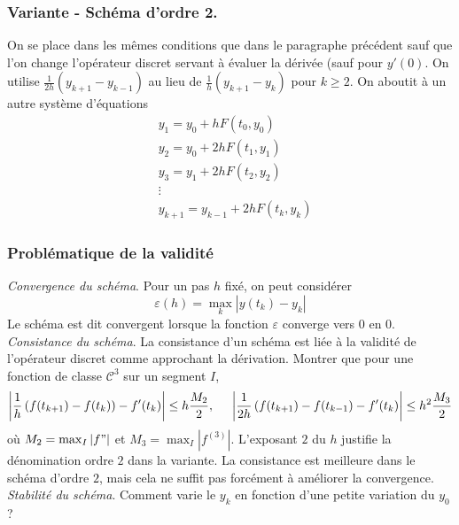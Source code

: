 \subsubsection{Variante - Schéma d'ordre 2.}
On se place dans les mêmes conditions que dans le paragraphe précédent sauf que l'on change l'opérateur discret servant à évaluer la dérivée (sauf pour $y'(0)$. On utilise $\frac{1}{2h}(y_{k+1}-y_{k-1})$ au lieu de $\frac{1}{h}(y_{k+1}-y_{k})$ pour $k\geq 2$. On aboutit à un autre système d'équations
\begin{align*}
  &y_1 = y_0 + hF(t_0,y_0) \\ &y_2 = y_0 + 2hF(t_1,y_1)\\ &y_3 = y_1 + 2hF(t_2,y_2)\\ &\vdots \\ &y_{k+1} = y_{k-1} + 2hF(t_k,y_k)
\end{align*}

\subsubsection{Problématique de la validité}
\emph{Convergence du schéma}. Pour un pas $h$ fixé, on peut considérer
\begin{displaymath}
  \varepsilon(h)=\max_{k}|y(t_k) - y_k|
\end{displaymath}
Le schéma est dit convergent lorsque la fonction $\varepsilon$ converge vers $0$ en $0$.\newline
\emph{Consistance du schéma}. La consistance d'un schéma est liée à la validité de l'opérateur discret comme approchant la dérivation.\newline
Montrer que pour une fonction de classe $\mathcal{C}^3$ sur un segment $I$,
\begin{displaymath}
  \left|\frac{1}{h}\left( f(t_{k+1})-f(t_k)\right) -f'(t_k) \right|\leq h\frac{M_2}{2},\hspace{0.5cm}
  \left|\frac{1}{2h}\left( f(t_{k+1})-f(t_{k-1}\right) -f'(t_k) \right|\leq h^2\frac{M_3}{2}
\end{displaymath}
où $M_2 = \max_{I}|f"|$ et $M_3 = \max_{I}|f^{(3)}|$. L'exposant $2$ du $h$ justifie la dénomination ordre $2$ dans la variante. La consistance est meilleure dans le schéma d'ordre $2$, mais cela ne suffit pas forcément à améliorer la convergence.\newline
\emph{Stabilité du schéma}. Comment varie le $y_k$ en fonction d'une petite variation du $y_0$?

